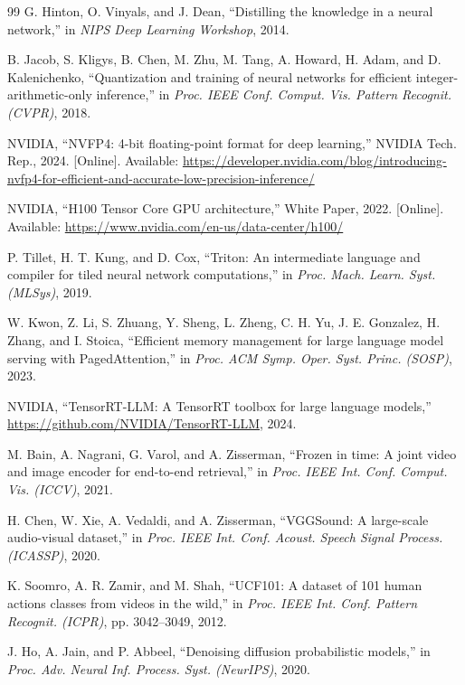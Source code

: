 \documentclass[journal,twoside]{IEEEtran}
\theoremstyle{definition}
\theoremstyle{remark}
\begin{document}
\begin{thebibliography}{99}
G. Hinton, O. Vinyals, and J. Dean, ``Distilling the knowledge in a neural network,'' in \textit{NIPS Deep Learning Workshop}, 2014.

B. Jacob, S. Kligys, B. Chen, M. Zhu, M. Tang, A. Howard, H. Adam, and D. Kalenichenko, ``Quantization and training of neural networks for efficient integer-arithmetic-only inference,'' in \textit{Proc. IEEE Conf. Comput. Vis. Pattern Recognit. (CVPR)}, 2018.

NVIDIA, ``{NVFP4}: 4-bit floating-point format for deep learning,'' NVIDIA Tech. Rep., 2024. [Online]. Available: \url{https://developer.nvidia.com/blog/introducing-nvfp4-for-efficient-and-accurate-low-precision-inference/}

NVIDIA, ``{H100} Tensor Core GPU architecture,'' White Paper, 2022. [Online]. Available: \url{https://www.nvidia.com/en-us/data-center/h100/}

P. Tillet, H. T. Kung, and D. Cox, ``Triton: An intermediate language and compiler for tiled neural network computations,'' in \textit{Proc. Mach. Learn. Syst. (MLSys)}, 2019.

W. Kwon, Z. Li, S. Zhuang, Y. Sheng, L. Zheng, C. H. Yu, J. E. Gonzalez, H. Zhang, and I. Stoica, ``Efficient memory management for large language model serving with {PagedAttention},'' in \textit{Proc. ACM Symp. Oper. Syst. Princ. (SOSP)}, 2023.

NVIDIA, ``{TensorRT-LLM}: A TensorRT toolbox for large language models,'' \url{https://github.com/NVIDIA/TensorRT-LLM}, 2024.

M. Bain, A. Nagrani, G. Varol, and A. Zisserman, ``Frozen in time: A joint video and image encoder for end-to-end retrieval,'' in \textit{Proc. IEEE Int. Conf. Comput. Vis. (ICCV)}, 2021.

H. Chen, W. Xie, A. Vedaldi, and A. Zisserman, ``{VGGSound}: A large-scale audio-visual dataset,'' in \textit{Proc. IEEE Int. Conf. Acoust. Speech Signal Process. (ICASSP)}, 2020.

K. Soomro, A. R. Zamir, and M. Shah, ``{UCF101}: A dataset of 101 human actions classes from videos in the wild,'' in \textit{Proc. IEEE Int. Conf. Pattern Recognit. (ICPR)}, pp. 3042--3049, 2012.

J. Ho, A. Jain, and P. Abbeel, ``Denoising diffusion probabilistic models,'' in \textit{Proc. Adv. Neural Inf. Process. Syst. (NeurIPS)}, 2020.


\end{thebibliography}
\end{document}
